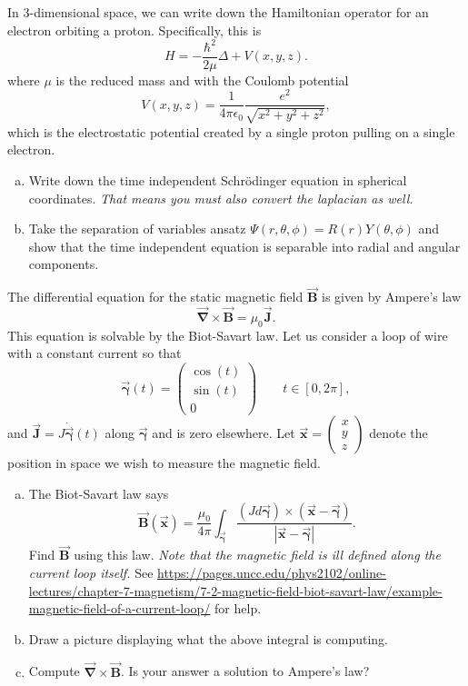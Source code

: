 \documentclass[12pt]{article} %
\newcommand{\grad}{\boldsymbol{\vec{\nabla}}}
\newcommand{\curvegamma}{\boldsymbol{\vec{\gamma}}}
\newcommand{\tangentgamma}{\boldsymbol{\dot{\vec{\gamma}}}}
\newcommand{\vecfieldB}{\boldsymbol{\vec{B}}}
\newcommand{\vecfieldJ}{\boldsymbol{\vec{J}}}
\newcommand{\vecx}{\boldsymbol{\vec{x}}}
\begin{document}
\begin{problem}
In 3-dimensional space, we can write down the Hamiltonian operator for an electron orbiting a proton. Specifically, this is
\[
H = -\frac{\hbar^2}{2\mu} \Delta + V(x,y,z).
\]
where $\mu$ is the reduced mass and with the Coulomb potential
    \[
    V(x,y,z) = \frac{1}{4\pi \epsilon_0} \frac{e^2}{\sqrt{x^2+y^2+z^2}},
    \]
which is the electrostatic potential created by a single proton pulling on a single electron. 
\begin{enumerate}[(a)]
    \item Write down the time independent Schr\"odinger equation in spherical coordinates. \emph{That means you must also convert the laplacian as well.}
    \item Take the separation of variables ansatz $\Psi(r,\theta,\phi) = R(r)Y(\theta,\phi)$ and show that the time independent equation is separable into radial and angular components.
\end{enumerate}
\end{problem}


\begin{problem}[BONUS]
The differential equation for the static magnetic field $\vecfieldB$ is given by Ampere's law
\[
\grad \times \vecfieldB = \mu_0 \vecfieldJ.
\]
This equation is solvable by the Biot-Savart law. Let us consider a loop of wire with a constant current so that
\[
\curvegamma(t) = \begin{pmatrix} \cos(t) \\ \sin(t) \\ 0 \end{pmatrix} \qquad t\in [0,2\pi],
\]
and $\vecfieldJ= J \tangentgamma(t)$ along $\curvegamma$ and is zero elsewhere. Let $\vecx = \begin{pmatrix} x \\ y \\ z \end{pmatrix}$ denote the position in space we wish to measure the magnetic field.
\begin{enumerate}[(a)]
    \item The Biot-Savart law says
    \[
    \vecfieldB(\vecx) = \frac{\mu_0}{4\pi} \int_{\curvegamma} \frac{(J d\curvegamma) \times (\vecx - \curvegamma)}{|\vecx-\curvegamma|}.
    \]
    Find $\vecfieldB$ using this law. \emph{Note that the magnetic field is ill defined along the current loop itself.} See \url{https://pages.uncc.edu/phys2102/online-lectures/chapter-7-magnetism/7-2-magnetic-field-biot-savart-law/example-magnetic-field-of-a-current-loop/} for help.
    \item Draw a picture displaying what the above integral is computing.
    \item Compute $\grad \times \vecfieldB$. Is your answer a solution to Ampere's law?
\end{enumerate}
\end{problem}
 
\end{document}

